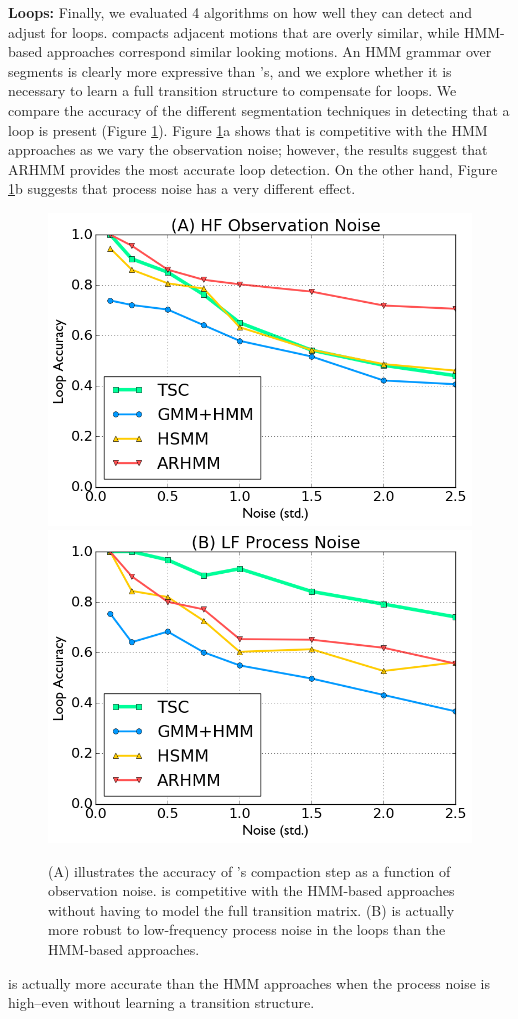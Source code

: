 \textbf{Loops: }
Finally, we evaluated 4 algorithms on how well they can detect and adjust for loops.
\tsc compacts adjacent motions that are overly similar, while HMM-based approaches correspond similar looking motions.
An HMM grammar over segments is clearly more expressive than \tsc's, and we explore whether it is necessary to learn a full transition structure to compensate for loops.
We compare the accuracy of the different segmentation techniques in detecting that a loop is present (Figure \ref{exp4}).
Figure \ref{exp4}a shows that \tsc is competitive with the HMM approaches as we vary the observation noise; however, the results suggest that ARHMM provides the most accurate loop detection.
On the other hand, Figure \ref{exp4}b suggests that process noise has a very different effect.
\begin{figure}[ht]
\centering
\includegraphics[width=0.48\columnwidth]{tsc-experiments/exp6.png}
\includegraphics[width=0.48\columnwidth]{tsc-experiments/exp7.png}
\caption{(A) illustrates the accuracy of \tsc's compaction step as a function of observation noise. \tsc is competitive with the HMM-based approaches without having to model the full transition matrix. (B) \tsc is actually more robust to low-frequency process noise in the loops than the HMM-based approaches. \label{exp4}}
\end{figure}
\tsc is actually more accurate than the HMM approaches when the process noise is high--even without learning a transition structure.

